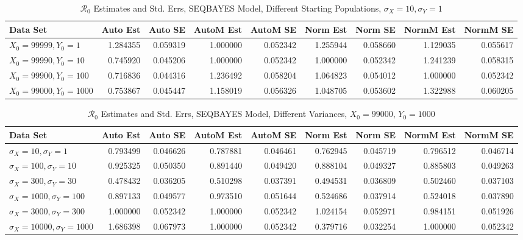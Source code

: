 \documentclass[12pt]{article}
\newcommand{\rr}{\ensuremath{\mathcal{R}_0}}
\begin{document}
\begin{table}[H]
	
	\caption{$\rr$ Estimates and Std. Errs, SEQBAYES Model,
		Different Starting Populations, 
		$\sigma_X = 10, \sigma_Y = 1$}
	\begin{footnotesize}
		\hskip -1.7cm
		\begin{tabular}{l|r|r|r|r|r|r|r|r}
			\hline
			Data Set & Auto Est & Auto SE & AutoM Est & AutoM SE & Norm Est & Norm SE & NormM Est & NormM SE\\
			\hline
			$X_0 = 99999, Y_0 = 1$ & 1.284355 & 0.059319 & 1.000000 & 0.052342 & 1.255944 & 0.058660 & 1.129035 & 0.055617\\
			\hline
			$X_0 = 99990, Y_0 = 10$ & 0.745920 & 0.045206 & 1.000000 & 0.052342 & 1.000000 & 0.052342 & 1.241239 & 0.058315\\
			\hline
			$X_0 = 99900, Y_0 = 100$ & 0.716836 & 0.044316 & 1.236492 & 0.058204 & 1.064823 & 0.054012 & 1.000000 & 0.052342\\
			\hline
			$X_0 = 99000, Y_0 = 1000$ & 0.753867 & 0.045447 & 1.158019 & 0.056326 & 1.048705 & 0.053602 & 1.322988 & 0.060205\\
			\hline
		\end{tabular}
	\end{footnotesize}
\end{table}

\begin{table}[H]
	
	\caption{$\rr$ Estimates and Std. Errs, SEQBAYES Model, 
		Different Variances, $X_0 = 99000$, $Y_0 = 1000$}
	\begin{footnotesize}
		\hskip -1.7cm
		\begin{tabular}{l|r|r|r|r|r|r|r|r}
			\hline
			Data Set & Auto Est & Auto SE & AutoM Est & AutoM SE & Norm Est & Norm SE & NormM Est & NormM SE\\
			\hline
			$\sigma_X = 10, \sigma_Y = 1$ & 0.793499 & 0.046626 & 0.787881 & 0.046461 & 0.762945 & 0.045719 & 0.796512 & 0.046714\\
			\hline
			$\sigma_X = 100, \sigma_Y = 10$ & 0.925325 & 0.050350 & 0.891440 & 0.049420 & 0.888104 & 0.049327 & 0.885803 & 0.049263\\
			\hline
			$\sigma_X = 300, \sigma_Y = 30$ & 0.478432 & 0.036205 & 0.510298 & 0.037391 & 0.494531 & 0.036809 & 0.502460 & 0.037103\\
			\hline
			$\sigma_X = 1000, \sigma_Y = 100$ & 0.897133 & 0.049577 & 0.973510 & 0.051644 & 0.524686 & 0.037914 & 0.524018 & 0.037890\\
			\hline
			$\sigma_X = 3000, \sigma_Y = 300$ & 1.000000 & 0.052342 & 1.000000 & 0.052342 & 1.024154 & 0.052971 & 0.984151 & 0.051926\\
			\hline
			$\sigma_X = 10000, \sigma_Y = 1000$ & 1.686398 & 0.067973 & 1.000000 & 0.052342 & 0.379716 & 0.032254 & 1.000000 & 0.052342\\
			\hline
		\end{tabular}
	\end{footnotesize}
\end{table}
\end{document}
